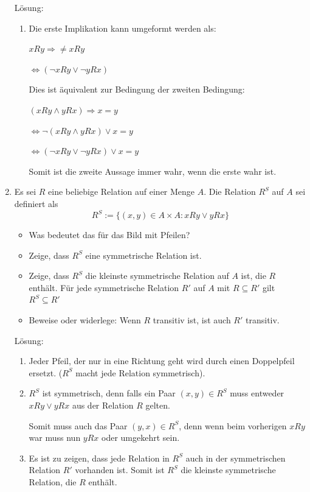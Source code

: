 \documentclass[main.tex]{subfiles}
\begin{document}
\begin{enumerate}
	      Lösung:
	      \begin{enumerate}
		      \item  Die erste Implikation kann umgeformt werden als:

		            \( xRy \Rightarrow \neq xRy \)

		            \( \Leftrightarrow (\neg xRy \lor \neg yRx) \)


		            Dies ist äquivalent zur Bedingung der zweiten Bedingung:

		            \( (xRy \land yRx) \Rightarrow x = y \)

		            \( \Leftrightarrow \neg(xRy \land yRx) \lor x = y \)

		            \( \Leftrightarrow (\neg xRy \lor \neg yRx) \lor x = y \)

		            Somit ist die zweite Aussage immer wahr, wenn die erste wahr ist.
	      \end{enumerate}
	\item Es sei \( R \) eine beliebige Relation auf einer Menge \( A \).
	      Die Relation \( R^S \) auf \( A \) sei definiert als
	      \[ R^S := \{ (x,y) \in A \times A : xRy \lor yRx \} \]
	      \begin{itemize}
		      \item Was bedeutet das für das Bild mit Pfeilen?
		      \item Zeige, dass \( R^S \) eine symmetrische Relation ist.
		      \item Zeige, dass \( R^S \) die kleinste symmetrische Relation auf \( A \) ist,
		            die \( R \) enthält.
		            Für jede symmetrische Relation \( R' \) auf \( A \) mit \( R \subseteq R' \)  gilt
		            \( R^S \subseteq R' \)
		      \item Beweise oder widerlege: Wenn \( R \) transitiv ist, ist auch \( R' \) transitiv.
	      \end{itemize}

	      Lösung:
	      \begin{enumerate}
		      \item Jeder Pfeil, der nur in eine Richtung geht wird durch einen Doppelpfeil ersetzt.
		            (\( R^S \) macht jede Relation symmetrisch).
		      \item \( R^S \) ist symmetrisch, denn falls ein Paar \( (x,y) \in R^S \) muss entweder
		            \( xRy \lor yRx \) aus der Relation \( R \) gelten.

		            Somit muss auch das Paar \( (y,x) \in R^S \),
		            denn wenn beim vorherigen \( xRy \) war muss nun \( yRx \) oder umgekehrt sein.
		      \item Es ist zu zeigen, dass jede Relation in \( R^S \) auch in der symmetrischen Relation \( R' \)
		            vorhanden ist. Somit ist \( R^S \) die kleinste symmetrische Relation, die \( R \) enthält.


\end{enumerate}
\end{enumerate}
\end{document}
